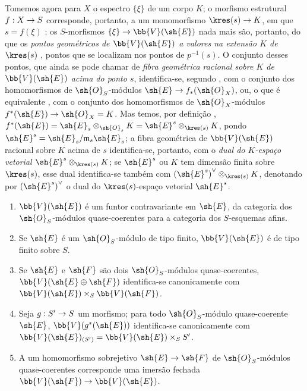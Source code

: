 \documentclass[oneside,10pt]{amsart}
\makeatletter
\providecommand{\dual}{}\renewcommand{\dual}[1]{{#1}^{\vee}}
\newcommand{\ega@arrow}[2]{\mathchoice{#1}{#2}{#2}{#2}}
\renewcommand{\to}{\ega@arrow{\longrightarrow}{\rightarrow}}
\let\EGAOriginalLabel\label
\renewcommand{\label}[1]{\phantomsection\EGAOriginalLabel{#1}}
\makeatother
\begin{document}
\begin{env}[1.7.10]
\label{II.1.7.10}
Tomemos agora para $X$ o espectro $\{\xi\}$ de um corpo $K$; o morfismo estrutural $f:X\to S$ corresponde, portanto, a um monomorfismo $\kres(s)\to K$, em que $s=f(\xi)$ ; os $S$-morfismos $\{\xi\}\to\bb{V}(\sh{E})$ nada mais são, portanto, do que os \emph{pontos geométricos de $\bb{V}(\sh{E})$ a valores na extensão $K$ de $\kres(s)$} , pontos que se localizam nos pontos de $p^{-1}(s)$.
O conjunto desses pontos, que ainda se pode chamar de \emph{fibra geométrica racional sobre $K$ de $\bb{V}(\sh{E})$ acima do ponto $s$}, identifica-se, segundo , com o conjunto dos homomorfismos de $\sh{O}_S$-módulos $\sh{E}\to f_*(\sh{O}_X)$, ou, o que é equivalente , com o conjunto dos homomorfismos de $\sh{O}_X$-módulos $f^*(\sh{E})\to\sh{O}_X=K$.
Mas temos, por definição , $f^*(\sh{E})=\sh{E}_s\otimes_{\sh{O}_s}K=\sh{E}^s\otimes_{\kres(s)}K$, pondo $\sh{E}^s=\sh{E}_s/\mathfrak{m}_s\sh{E}_s$; a fibra geométrica de $\bb{V}(\sh{E})$ racional sobre $K$ acima de $s$ identifica-se, portanto, com o \emph{dual do $K$-espaço vetorial $\sh{E}^s\otimes_{\kres(s)}K$}; se $\sh{E}^s$ ou $K$ tem dimensão finita sobre $\kres(s)$, esse dual identifica-se também com $\dual{(\sh{E}^s)}\otimes_{\kres(s)}K$, denotando por $\dual{(\sh{E}^s)}$ o dual do $\kres(s)$-espaço vetorial $\sh{E}^s$.
\end{env}

\begin{proposition}[1.7.11]
\label{II.1.7.11}
\medskip\noindent
\begin{enumerate}
  \item[{\rm(i)}] $\bb{V}(\sh{E})$ é um funtor contravariante em $\sh{E}$, da categoria dos $\sh{O}_S$-módulos quase-coerentes para a categoria dos $S$-esquemas afins.
  \item[{\rm(ii)}] Se $\sh{E}$ é um $\sh{O}_S$-módulo de tipo finito, $\bb{V}(\sh{E})$ é de tipo finito sobre $S$.
  \item[{\rm(iii)}] Se $\sh{E}$ e $\sh{F}$ são dois $\sh{O}_S$-módulos quase-coerentes, $\bb{V}(\sh{E}\oplus\sh{F})$ identifica-se canonicamente com $\bb{V}(\sh{E})\times_S\bb{V}(\sh{F})$.
  \item[{\rm(iv)}] Seja $g:S'\to S$ um morfismo; para todo $\sh{O}_S$-módulo quase-coerente $\sh{E}$, $\bb{V}(g^*(\sh{E}))$ identifica-se canonicamente com $\bb{V}(\sh{E})_{(S')}=\bb{V}(\sh{E})\times_S S'$.
  \item[{\rm(v)}] A um homomorfismo sobrejetivo $\sh{E}\to\sh{F}$ de $\sh{O}_S$-módulos quase-coerentes corresponde uma imersão fechada $\bb{V}(\sh{F})\to\bb{V}(\sh{E})$.
\end{enumerate}
\end{proposition}
\end{document}

